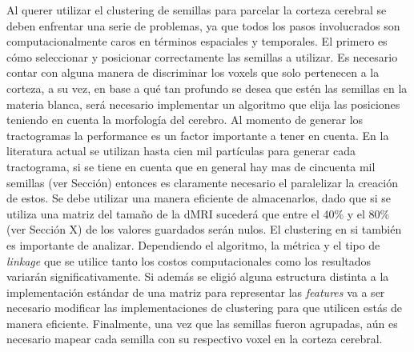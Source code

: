 Al querer utilizar el clustering de semillas para parcelar la corteza cerebral
se deben enfrentar una serie de problemas, ya que todos los pasos involucrados
son computacionalmente caros en t\'erminos espaciales y temporales. El primero
es c\'omo seleccionar y posicionar correctamente las semillas a utilizar. Es 
necesario contar con alguna manera de discriminar los voxels que solo pertenecen
a la corteza, a su vez, en base a qu\'e tan profundo se desea que est\'en las semillas 
en la materia blanca, ser\'a necesario implementar un algoritmo que elija las 
posiciones teniendo en cuenta la morfolog\'ia del cerebro. Al momento de generar
los tractogramas la performance es un factor importante a tener en cuenta. En la
literatura actual se utilizan hasta cien mil part\'iculas \cite{Moreno-Dominguez2014}
para generar cada tractograma, si se tiene en cuenta que en general hay mas de
cincuenta mil semillas (ver Secci\'on) entonces es claramente necesario el paralelizar
la creaci\'on de estos. Se debe utilizar una manera eficiente de almacenarlos, 
dado que si se utiliza una matriz del tama\~no de la dMRI suceder\'a que entre
el 40\% y el 80\% (ver Secci\'on X) de los valores guardados ser\'an nulos. El
clustering en si tambi\'en es importante de analizar. Dependiendo el algoritmo,
la m\'etrica y el tipo de \textit{linkage} que se utilice tanto los costos
computacionales como los resultados variar\'an significativamente. Si adem\'as 
se eligi\'o alguna estructura distinta a la implementaci\'on est\'andar de una
matriz para representar las \textit{features} va a ser necesario modificar las
implementaciones de clustering para que utilicen est\'as de manera eficiente.
Finalmente, una vez que las semillas fueron agrupadas, a\'un es necesario mapear
cada semilla con su respectivo voxel en la corteza cerebral. \\

